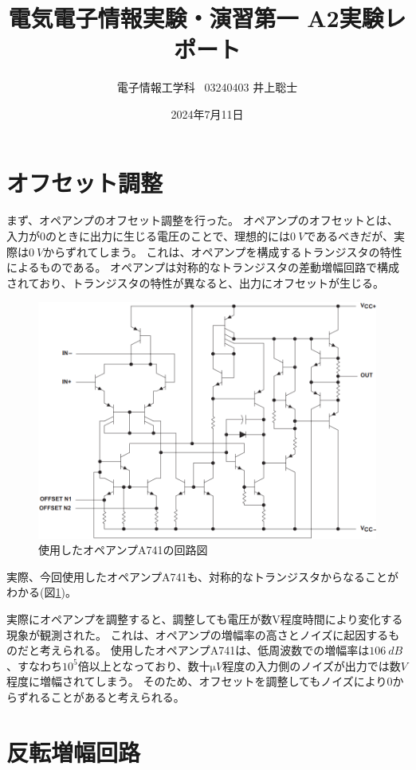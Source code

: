 \documentclass[a4paper]{ltjsarticle}
\title{電気電子情報実験・演習第一 A2実験レポート}
\author{電子情報工学科 \ 03240403 井上聡士}
\date{2024年7月11日}
\begin{document}
\maketitle %
\tableofcontents
\clearpage

\section{オフセット調整}
まず、オペアンプのオフセット調整を行った。
オペアンプのオフセットとは、入力が0のときに出力に生じる電圧のことで、理想的には$\SI{0}{V}$であるべきだが、実際は$\SI{0}{V}$からずれてしまう。
これは、オペアンプを構成するトランジスタの特性によるものである。
オペアンプは対称的なトランジスタの差動増幅回路で構成されており、トランジスタの特性が異なると、出力にオフセットが生じる\cite{Opamp offset}。
\begin{figure}[htbp]
    \centering
    \includegraphics[width=0.6\columnwidth]{./images/opamp_uA741.png}
    \caption{使用したオペアンプ\mu A741の回路図}
    \label{fig:uA741_circuit}
\end{figure}
実際、今回使用したオペアンプ\mu A741も、対称的なトランジスタからなることがわかる(図\ref{fig:uA741_circuit})\cite{uA741}。

実際にオペアンプを調整すると、調整しても電圧が数V程度時間により変化する現象が観測された。
これは、オペアンプの増幅率の高さとノイズに起因するものだと考えられる。
使用したオペアンプ\mu A741は、低周波数での増幅率は$\SI{106}{dB}$、すなわち$10^5$倍以上となっており、数十$\si{\micro V}$程度の入力側のノイズが出力では数$\si{V}$程度に増幅されてしまう\cite{uA741}。
そのため、オフセットを調整してもノイズにより0からずれることがあると考えられる。

\section{反転増幅回路}
\end{document}
